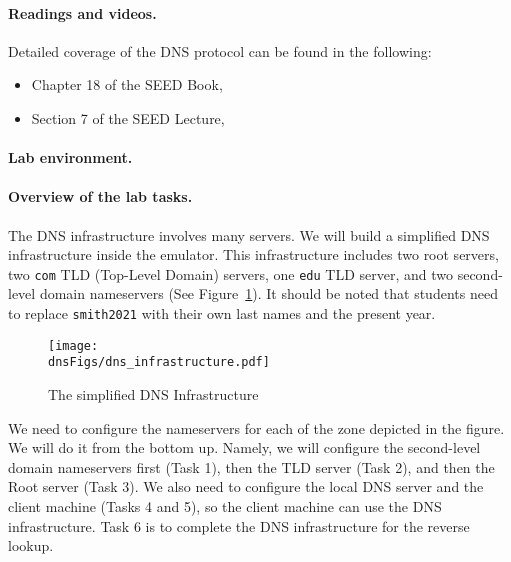 \paragraph{Readings and videos.}
Detailed coverage of the DNS protocol can be found in the following:

\begin{itemize}
\item Chapter 18 of the SEED Book, \seedbook
\item Section 7 of the SEED Lecture, \seedisvideo
\end{itemize}


\paragraph{Lab environment.} 
\seedenvironmentB
\nodependency

\paragraph{Overview of the lab tasks.}
The DNS infrastructure involves many servers. We will
build a simplified DNS infrastructure inside the emulator. 
This infrastructure includes two root servers, two \texttt{com}
TLD (Top-Level Domain) servers, one \texttt{edu} TLD server,
and two second-level domain nameservers (See 
Figure~\ref{dns:fig:dns-infrastructure}). It should be noted 
that students need to replace \texttt{smith2021} with their 
own last names and the present year. 


\begin{figure}[htb]
  \begin{center}
    \texttt{[image: \\dnsFigs/dns\_infrastructure.pdf]}
  \end{center}
  \caption{The simplified DNS Infrastructure}
  \label{dns:fig:dns-infrastructure}
\end{figure}

We need to configure the nameservers for each of the zone
depicted in the figure. We will do it from the bottom up.
Namely, we will configure the second-level domain nameservers
first (Task 1), then the TLD server (Task 2), and 
then the Root server (Task 3). We also need to configure
the local DNS server and the client machine (Tasks 4 and 5), 
so the client machine can use the DNS infrastructure. 
Task 6 is to complete the DNS infrastructure for the reverse 
lookup.



